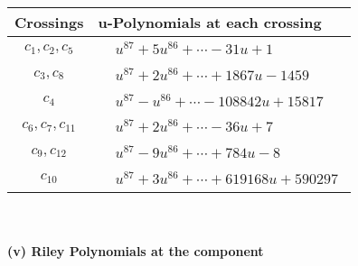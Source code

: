\documentclass[1p]{elsarticle_modified}
\theoremstyle{definition}
\begin{document}
\begin{tabular}{m{50pt}|m{274pt}}
Crossings & \hspace{64pt}u-Polynomials at each crossing \\
\hline $$\begin{aligned}c_{1},c_{2},c_{5}\end{aligned}$$&$\begin{aligned}
&u^{87}+5 u^{86}+\cdots-31 u+1
\end{aligned}$\\
\hline $$\begin{aligned}c_{3},c_{8}\end{aligned}$$&$\begin{aligned}
&u^{87}+2 u^{86}+\cdots+1867 u-1459
\end{aligned}$\\
\hline $$\begin{aligned}c_{4}\end{aligned}$$&$\begin{aligned}
&u^{87}- u^{86}+\cdots-108842 u+15817
\end{aligned}$\\
\hline $$\begin{aligned}c_{6},c_{7},c_{11}\end{aligned}$$&$\begin{aligned}
&u^{87}+2 u^{86}+\cdots-36 u+7
\end{aligned}$\\
\hline $$\begin{aligned}c_{9},c_{12}\end{aligned}$$&$\begin{aligned}
&u^{87}-9 u^{86}+\cdots+784 u-8
\end{aligned}$\\
\hline $$\begin{aligned}c_{10}\end{aligned}$$&$\begin{aligned}
&u^{87}+3 u^{86}+\cdots+619168 u+590297
\end{aligned}$\\
\hline
\end{tabular}\\~\\
\newpage\renewcommand{\arraystretch}{1}
\flushleft \textbf{(v) Riley Polynomials at the component}\newline \\
\end{document}
